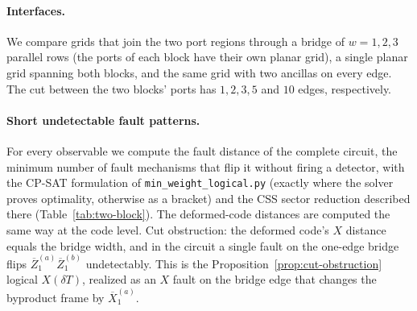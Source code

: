 \documentclass[aps,prx,reprint,superscriptaddress,nofootinbib,floatfix,longbibliography]{revtex4-2}
\theoremstyle{definition}
\begin{document}
\paragraph{Interfaces.}
We compare grids that join the two port regions through a bridge of $w=1,2,3$
parallel rows (the ports of each block have their own planar grid), a single
planar grid spanning both blocks, and the same grid with two ancillas on every
edge.  The cut between the two blocks' ports has $1,2,3,5$ and $10$ edges,
respectively.

\paragraph{Short undetectable fault patterns.}
For every observable we compute the fault distance of the complete circuit,
the minimum number of fault mechanisms that flip it without firing a
detector, with the CP-SAT formulation of \texttt{min\_weight\_logical.py} (exactly where the solver proves optimality, otherwise as a bracket)
and the CSS sector reduction described there (Table~\ref{tab:two-block}).  The
deformed-code distances are computed the same way at the code level.  Cut
obstruction: the deformed code's $X$ distance equals the bridge width, and in
the circuit a single fault on the one-edge bridge flips
$\overline Z_1^{(a)}\overline Z_1^{(b)}$ undetectably.  This is the
Proposition~\ref{prop:cut-obstruction} logical $X(\delta T)$, realized as an
$X$ fault on the bridge edge that changes the byproduct frame by
$\overline X_1^{(a)}$.
\end{document}
